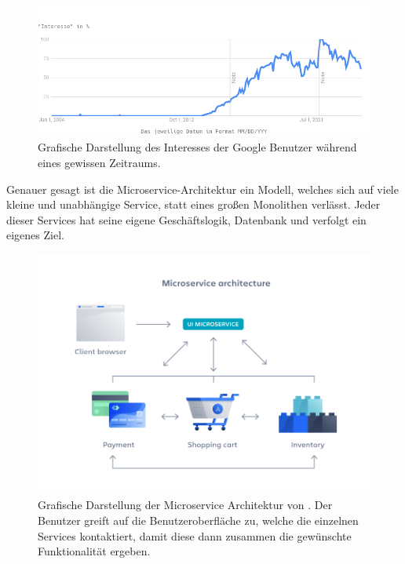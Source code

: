 \begin{figure}
  \centering
    \includegraphics[width=1.0\textwidth]{images/stat-microservice-trend-google.png}
   \caption{Grafische Darstellung des Interesses der Google Benutzer während eines gewissen Zeitraums. \cite{stats-google-microservice-trend}}
   \label{stats-microservice-trend-google}
\end{figure}

Genauer gesagt ist die Microservice-Architektur ein Modell, welches sich auf viele kleine und unabhängige Service, statt eines großen Monolithen verlässt. Jeder dieser Services hat seine eigene Geschäftslogik, Datenbank und verfolgt ein eigenes Ziel.


\begin{figure}
  \centering
    \includegraphics[width=1.0\textwidth]{images/microservice-architecture-atlassian.png}
   \caption{Grafische Darstellung der Microservice Architektur von \cite{website-atlassian-microservice-vs-monolothic}. Der Benutzer greift auf die Benutzeroberfläche zu, welche die einzelnen Services kontaktiert, damit diese dann zusammen die gewünschte Funktionalität ergeben.}
   \label{microservice-arch-atlassian}
\end{figure}

